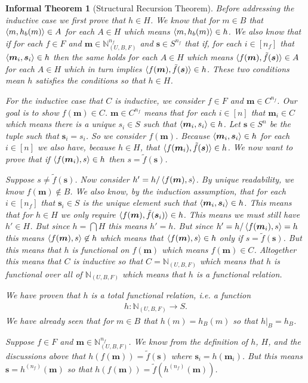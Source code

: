 \documentclass[12pt]{article}
\theoremstyle{break}
\theoremstyle{break}
\theoremstyle{break}
\theoremstyle{break}
\theoremstyle{break}
\newtheorem{informal definition}[definition]{Informal Definition}
\theoremstyle{break}
\newtheorem{informal theorem}[theorem]{Informal Theorem}
\newcommand{\bv}[1]{\boldsymbol{#1}}
\newcommand{\natnum}[0]{\mathbb{N}}
\begin{document}
\begin{informal theorem}[Structural Recursion Theorem]
		Before addressing the inductive case we first prove that $h \in H$.
		We know that for $m\in B$ that $\braket{m, h_b(m)} \in A$ for each $A\in H$ which means $\braket{m, h_b(m)} \in h$.
		We also know that if for each $f\in F$ and $\bv{m}\in \natnum_{(U, B, F)}^{n_f}$ and $\bv{s}\in S^{n_f}$ that if, for each $i \in [n_f]$ that $\braket{\bv{m}_i, \bv{s}_i} \in h$ then the same holds for each $A\in H$ which means $\braket{f(\bv{m}), \tilde{f}(\bv{s})}\in A$ for each $A\in H$ which in turn implies $\braket{f(\bv{m}), \tilde{f}(\bv{s})}\in h$. 
		These two conditions mean $h$ satisfies the conditions so that $h\in H$.
			
		For the inductive case that $C$ is inductive, we consider $f\in F$ and  $\bv{m}\in C^{n_f}$.
		Our goal is to show $f(\bv{m})\in C$.
		$\bv{m}\in C^{n_f}$ means that for each $i\in [n]$ that $\bv{m}_i\in C$ which means there is a unique $s_i\in S$ such that $\braket{\bv{m}_i, s_i}\in h$.
		Let $\bv{s} \in S^n$ be the tuple such that $\bv{s}_i = s_i$.
		So we consider $f(\bv{m})$. Because $\braket{\bv{m}_i, \bv{s}_i} \in h$ for each $i\in [n]$ we also have, because $h\in H$, that $\braket{f(\bv{m}_i), \tilde{f}(\bv{s})} \in h$.
		We now want to prove that if $\braket{f(\bv{m}_i), s}\in h$ then $s = \tilde{f}(\bv{s})$.
		
		Suppose $s \not = \tilde{f}(\bv{s})$.
		Now consider $h' = h/\braket{f(\bv{m}), s}$.
		By unique readability, we know $f(\bv{m}) \not\in B$.
		We also know, by the induction assumption, that for each $i \in [n_f]$ that $\bv{s}_i\in S$ is the unique element such that $\braket{\bv{m}_i, \bv{s}_i} \in h$.
		This means that for $h\in H$ we only require $\braket{f(\bv{m}), \tilde{f}(\bv{s}_i)} \in h$. 
		This means we must still have $h' \in H$.
		But since $h = \bigcap H$ this means $h' = h$.
		But since $h' = h/\braket{f(\bv{m}_i), s} = h$ this means $\braket{f(\bv{m}), s}\not \in h$ which means that $\braket{f(\bv{m}), s}\in h$ only if $s = \tilde{f}(\bv{s})$. 
		But this means that $h$ is functional on $f(\bv{m})$ which means $f(\bv{m}) \in C$.
		Altogether this means that $C$ is inductive so that $C = \natnum_{(U, B, F)}$ which means that $h$ is functional over all of $\natnum_{(U, B, F)}$ which means that $h$ is a functional relation.
		
		We have proven that $h$ is a total functional relation, i.e. a function 
		\begin{align*}
			h: \natnum_{(U, B, F)} \to S.
		\end{align*}
		We have already seen that for $m\in B$ that $h(m) = h_B(m)$ so that $h|_B = h_B$.
		
		Suppose $f\in F$ and $\bv{m} \in \natnum_{(U, B, F)}^{n_f}$.
		We know from the definition of $h$, $H$, and the discussions above that $h(f(\bv{m})) = \tilde{f}(\bv{s})$
		where $\bv{s}_i = h(\bv{m}_i)$.
		But this means $\bv{s} = h^{(n_f)}(\bv{m})$ so that $h(f(\bv{m})) = \tilde{f}(h^{(n_f)}(\bv{m}))$.
	\end{informal theorem}
	
\end{document}
